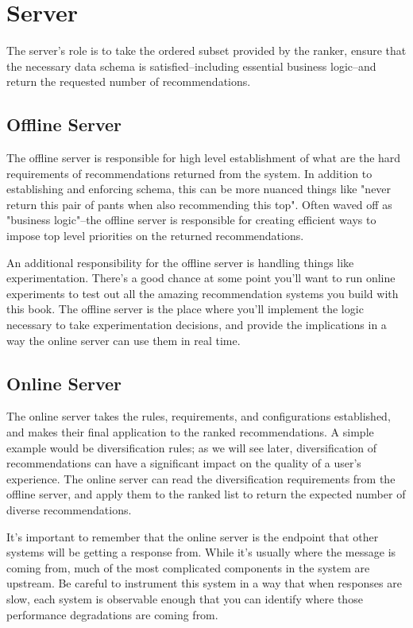 \section{Server}

The server's role is to take the ordered subset provided by the ranker, ensure that the necessary data schema is satisfied–including essential business logic–and return the requested number of recommendations. 

\subsection{Offline Server}

The offline server is responsible for high level establishment of what are the hard requirements of recommendations returned from the system. In addition to establishing and enforcing schema, this can be more nuanced things like "never return this pair of pants when also recommending this top". Often waved off as "business logic"–the offline server is responsible for creating efficient ways to impose top level priorities on the returned recommendations. 

An additional responsibility for the offline server is handling things like experimentation. There's a good chance at some point you'll want to run online experiments to test out all the amazing recommendation systems you build with this book. The offline server is the place where you'll implement the logic necessary to take experimentation decisions, and provide the implications in a way the online server can use them in real time.

\subsection{Online Server}

The online server takes the rules, requirements, and configurations established, and makes their final application to the ranked recommendations. A simple example would be diversification rules; as we will see later, diversification of recommendations can have a significant impact on the quality of a user's experience. The online server can read the diversification requirements from the offline server, and apply them to the ranked list to return the expected number of diverse recommendations.

It's important to remember that the online server is the endpoint that other systems will be getting a response from. While it's usually where the message is coming from, much of the most complicated components in the system are upstream. Be careful to instrument this system in a way that when responses are slow, each system is observable enough that you can identify where those performance degradations are coming from.